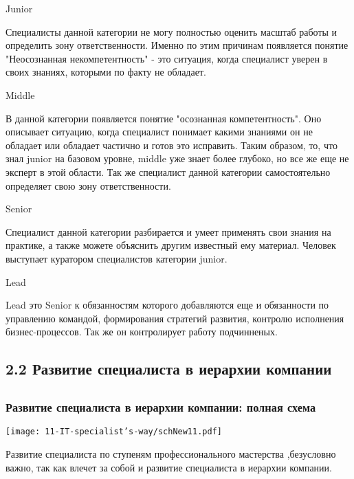 \documentclass{../industrial-development}
\begin{document}
\lecturenotes

Junior~\cite{JMSL}

Специалисты данной категории не могу полностью оценить масштаб работы и определить зону ответственности. Именно по этим причинам появляется понятие "Неосознанная некомпетентность" - это ситуация, когда специалист уверен в своих знаниях, которыми по факту не обладает. 

Middle 

В данной категории появляется понятие "осознанная компетентность". Оно описывает ситуацию, когда специалист понимает какими знаниями он не обладает или обладает частично и готов это исправить. Таким образом, то, что знал junior на базовом уровне, middle уже знает более глубоко, но все же еще не эксперт в этой области. Так же специалист данной категории самостоятельно определяет свою зону ответственности.

Senior

Специалист данной категории разбирается и умеет применять свои знания на практике, а также можете объяснить другим известный ему материал. Человек выступает куратором специалистов категории junior.

Lead

Lead это Senior к обязанностям которого добавляются еще и обязанности по управлению командой, формирования стратегий развития, контролю исполнения бизнес-процессов. Так же он контролирует работу подчинненых.



\subsection{2.2 Развитие  специалиста в иерархии компании }

\subsection{}

\begin{frame} \frametitle{Развитие  специалиста в иерархии компании: полная схема }
  \centerline{\texttt{[image: 11-IT-specialist's-way/schNew11.pdf]}}
\end{frame}

\lecturenotes

Развитие  специалиста по ступеням профессионального мастерства ,безусловно важно, так как влечет за собой и развитие специалиста в иерархии компании.
\end{document}
